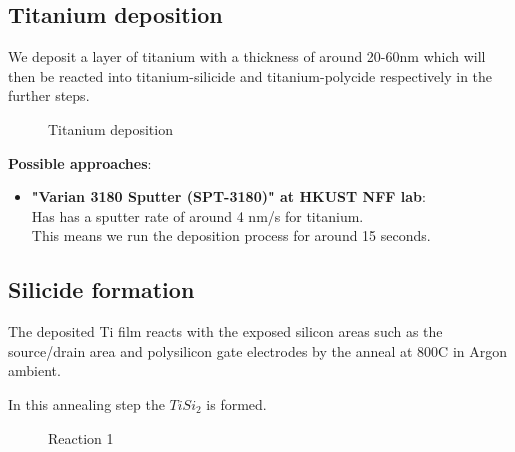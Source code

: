 \subsection{Titanium deposition}

We deposit a layer of titanium with a thickness of around 20-60nm which will then be reacted into titanium-silicide and titanium-polycide respectively in the further steps.

\begin{figure}[H]
	\centering
	\begin{tikzpicture}[node distance = 3cm, auto, thick,scale=\CrossSectionOnly, every node/.style={transform shape}]
		
	\end{tikzpicture}
	\drawStepArrow{}
	\begin{tikzpicture}[node distance = 3cm, auto, thick,scale=\CrossSectionOnly, every node/.style={transform shape}]
		
	\end{tikzpicture}
	\caption{Titanium deposition}
\end{figure}

\textbf{Possible approaches}:
\begin{itemize}
	\item\textbf{"Varian 3180 Sputter (SPT-3180)" at HKUST NFF lab}:\\
	Has has a sputter rate of around 4 nm/s for titanium. \\
	This means we run the deposition process for around 15 seconds.
\end{itemize}

\newpage

\subsection{Silicide formation}

The deposited Ti film reacts with the exposed silicon areas such as the source/drain area and polysilicon gate electrodes by the anneal at 800\degree C in Argon ambient.

In this annealing step the $Ti Si_2$ is formed.

\begin{figure}[H]
	\centering
	\begin{tikzpicture}[node distance = 3cm, auto, thick,scale=\CrossSectionOnly, every node/.style={transform shape}]
		
	\end{tikzpicture}
	\drawStepArrow{}
	\begin{tikzpicture}[node distance = 3cm, auto, thick,scale=\CrossSectionOnly, every node/.style={transform shape}]
		
	\end{tikzpicture}
	\caption{Reaction 1}
\end{figure}

